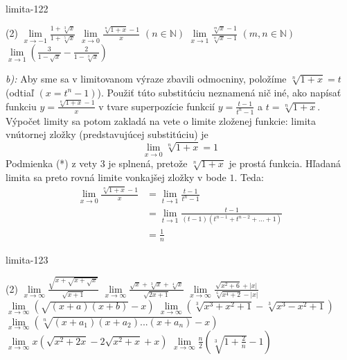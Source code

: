 \begin{defproblem}{limita-122}
\begin{tasks}(2)
\task $\lim\limits_{x \rightarrow -1} \frac{1+\sqrt[3]{x}}{1+\sqrt[5]{x}}$
\task $\lim\limits_{x \rightarrow 0} \frac{\sqrt[n]{1+x}-1}{x}$  $(n \in \mathbb{N})$
\task $\lim\limits_{x \rightarrow 1} \frac{\sqrt[m]{x}-1}{\sqrt[n]{x}-1}$  $(m,n \in \mathbb{N})$
\task $\lim\limits_{x \rightarrow 1} (\frac{3}{1-\sqrt{x}}-\frac{2}{1-\sqrt[3]{x}})$
\end{tasks}

\begin{solution}
    \textit{b):}
    Aby sme sa v limitovanom výraze zbavili odmocniny, položíme
    $\sqrt[n]{1+x}=t$ (odtiaľ $(x=t^n-1)$). Použiť túto substitúciu neznamená
    nič iné, ako napísať funkciu $y=\frac{\sqrt[n]{1+x}-1}{x}$ v tvare
    superpozície funkcií $y=\frac{t-1}{t^n-1}$ a $t=\sqrt[n]{1+x}$. Výpočet
    limity sa potom zakladá na vete o limite zloženej funkcie: limita vnútornej
    zložky (predstavujúcej substitúciu) je
    \[
        \lim\limits_{x \rightarrow 0} \sqrt[n]{1+x} = 1
    \]
    Podmienka (*) z vety $3$ je splnená, pretože $\sqrt[n]{1+x}$ je prostá
    funkcia. Hľadaná limita sa preto rovná limite vonkajšej zložky v bode $1$.
    Teda:
    \begin{align*}
        \lim\limits_{x \rightarrow 0} \frac{\sqrt[n]{1 + x} - 1}{x}
        &= \lim\limits_{t \rightarrow 1} \frac{t - 1}{t^n - 1} \\
        &= \lim\limits_{t \rightarrow 1}
            \frac{t - 1}{(t - 1)(t^{n - 1} + t^{n - 2} + ... + 1)} \\
        &= \frac{1}{n}
    \end{align*}
\end{solution}

\end{defproblem}

\begin{defproblem}{limita-123}
\begin{tasks}(2)
    \task $\lim\limits_{{x \rightarrow \infty}} \frac{\sqrt{x+\sqrt{x+\sqrt{x}}}}{\sqrt{x+1}}$
    \task $\lim\limits_{{x \rightarrow \infty}} \frac{\sqrt{x}+\sqrt[3]{x}+\sqrt[4]{x}}{\sqrt{2x+1}}$
    \task $\lim\limits_{{x \rightarrow \infty}} \frac{\sqrt{x^2+6}+|x|}{\sqrt[6]{x^4+2}-|x|}$
    \task $\lim\limits_{{x \rightarrow \infty}} (\sqrt{(x+a)(x+b)}-x)$
    \task* $\lim\limits_{{x \rightarrow \infty}} (\sqrt[3]{x^3+x^2+1}-\sqrt[3]{x^3-x^2+1})$
    \task* $\lim\limits_{{x \rightarrow \infty}} (\sqrt[n]{(x+a_1)(x+a_2)...(x+a_n)}-x)$
    \task* $\lim\limits_{{x \rightarrow \infty}} x(\sqrt{x^2+2x}-2\sqrt{x^2+x}+x)$
    \task $\lim\limits_{{x \rightarrow \infty}} \frac{n}{2}(\sqrt[3]{1+\frac{2}{n}}-1)$
\end{tasks}
\end{defproblem}

